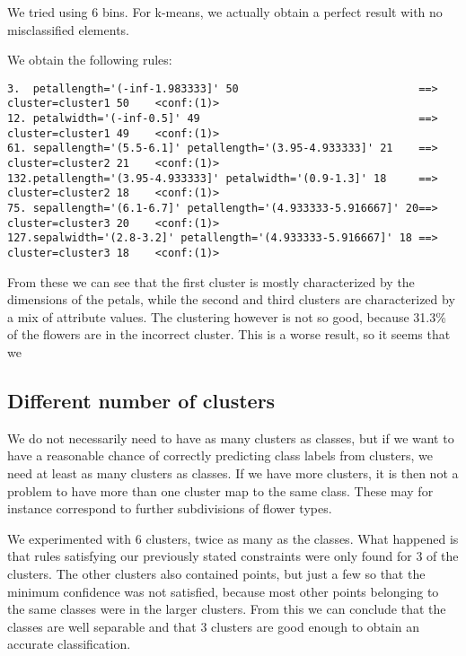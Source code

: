 \documentclass[]{article}
\begin{document}
We tried using 6 bins. For k-means, we actually obtain a perfect result with no misclassified elements.

We obtain the following rules:
\begin{lstlisting}
3. 	petallength='(-inf-1.983333]' 50 							==> cluster=cluster1 50    <conf:(1)>
12. petalwidth='(-inf-0.5]' 49 									==> cluster=cluster1 49    <conf:(1)> 
61. sepallength='(5.5-6.1]' petallength='(3.95-4.933333]' 21 	==> cluster=cluster2 21    <conf:(1)>
132.petallength='(3.95-4.933333]' petalwidth='(0.9-1.3]' 18 	==> cluster=cluster2 18    <conf:(1)> 
75. sepallength='(6.1-6.7]' petallength='(4.933333-5.916667]' 20==> cluster=cluster3 20    <conf:(1)>
127.sepalwidth='(2.8-3.2]' petallength='(4.933333-5.916667]' 18 ==> cluster=cluster3 18    <conf:(1)>
\end{lstlisting}
From these we can see that the first cluster is mostly characterized by the dimensions of the petals, while the second and third clusters are characterized by a mix of attribute values. The clustering however is not so good, because 31.3\% of the flowers are in the incorrect cluster. This is a worse result, so it seems that we 

\subsection{Different number of clusters}
We do not necessarily need to have as many clusters as classes, but if we want to have a reasonable chance of correctly predicting class labels from clusters, we need at least as many clusters as classes. If we have more clusters, it is then not a problem to have more than one cluster map to the same class. These may for instance correspond to further subdivisions of flower types. 

We experimented with 6 clusters, twice as many as the classes. What happened is that rules satisfying our previously stated constraints were only found for 3 of the clusters. The other clusters also contained points, but just a few so that the minimum confidence was not satisfied, because most other points belonging to the same classes were in the larger clusters. From this we can conclude that the classes are well separable and that 3 clusters are good enough to obtain an accurate classification.
\end{document}
